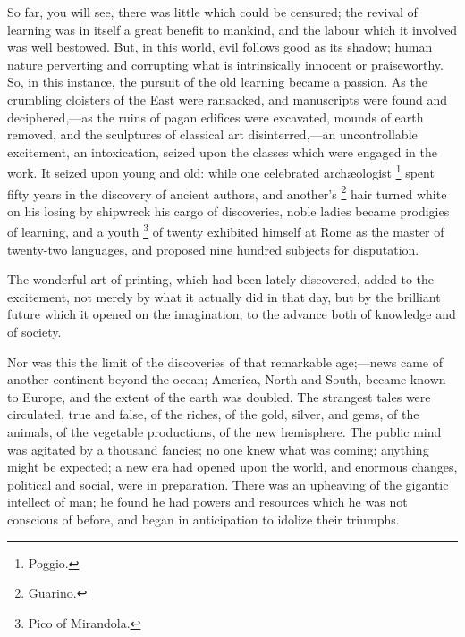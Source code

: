 So far, you will see, there was little which could be
censured; the revival of learning was in itself a great
benefit to mankind, and the labour which it involved was
well bestowed. But, in this world, evil follows good as
its shadow; human nature perverting and corrupting what
is intrinsically innocent or praiseworthy. So, in this
instance, the pursuit of the old learning became a
passion. As the crumbling cloisters of the East were
ransacked, and manuscripts were found and
deciphered,—as the ruins of pagan edifices were
excavated, mounds of earth removed, and the sculptures of
classical art disinterred,—an uncontrollable
excitement, an intoxication, seized upon the classes
which were engaged in the work. It seized upon young and
old: while one celebrated archæologist \footnote{Poggio.} spent
fifty years in the discovery of ancient authors, and
another's \footnote{Guarino.}
hair turned white on his losing by shipwreck his cargo of
discoveries, noble ladies became prodigies of learning,
and a youth \footnote{Pico of Mirandola.} of twenty exhibited himself at Rome as the master
of twenty-two languages, and proposed nine hundred
subjects for disputation.

The wonderful art of printing, which had been lately
discovered, added to the excitement, not merely by what
it actually did in that day, but by the brilliant future
which it opened on the imagination, to the advance both
of knowledge and of society.

Nor was this the limit of the discoveries of that
remarkable age;—news came of another continent
beyond the ocean; America, North and South, became known
to Europe, and the extent of the earth was doubled. The
strangest tales were circulated, true and false, of the
riches, of the gold, silver, and gems, of the animals, of
the vegetable productions, of the new hemisphere. The
public mind was agitated by a thousand fancies; no one
knew what was coming; anything might be expected; a new
era had opened upon the world, and enormous changes,
political and social, were in preparation. There was an
upheaving of the gigantic intellect of man; he found he
had powers and resources which he was not conscious of
before, and began in anticipation to idolize their
triumphs.

